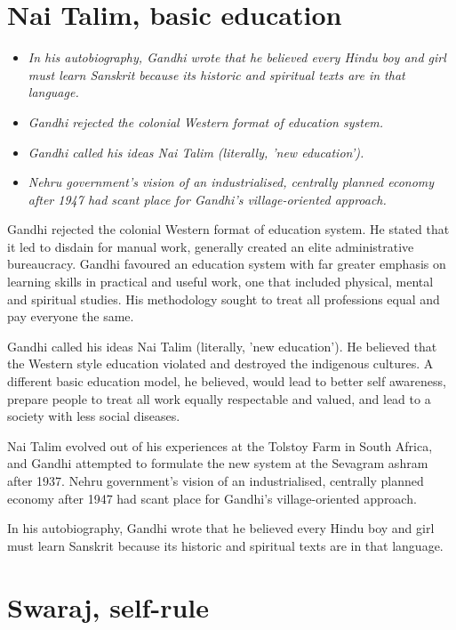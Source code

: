 \section{Nai Talim, basic education}\label{nai-talim-basic-education}

\begin{itemize}
\item
  \emph{In his autobiography, Gandhi wrote that he believed every Hindu
  boy and girl must learn Sanskrit because its historic and spiritual
  texts are in that language.}
\item
  \emph{Gandhi rejected the colonial Western format of education
  system.}
\item
  \emph{Gandhi called his ideas Nai Talim (literally, 'new education').}
\item
  \emph{Nehru government's vision of an industrialised, centrally
  planned economy after 1947 had scant place for Gandhi's
  village-oriented approach.}
\end{itemize}

Gandhi rejected the colonial Western format of education system. He
stated that it led to disdain for manual work, generally created an
elite administrative bureaucracy. Gandhi favoured an education system
with far greater emphasis on learning skills in practical and useful
work, one that included physical, mental and spiritual studies. His
methodology sought to treat all professions equal and pay everyone the
same.

Gandhi called his ideas Nai Talim (literally, 'new education'). He
believed that the Western style education violated and destroyed the
indigenous cultures. A different basic education model, he believed,
would lead to better self awareness, prepare people to treat all work
equally respectable and valued, and lead to a society with less social
diseases.

Nai Talim evolved out of his experiences at the Tolstoy Farm in South
Africa, and Gandhi attempted to formulate the new system at the Sevagram
ashram after 1937. Nehru government's vision of an industrialised,
centrally planned economy after 1947 had scant place for Gandhi's
village-oriented approach.

In his autobiography, Gandhi wrote that he believed every Hindu boy and
girl must learn Sanskrit because its historic and spiritual texts are in
that language.

\section{Swaraj, self-rule}\label{swaraj-self-rule}

